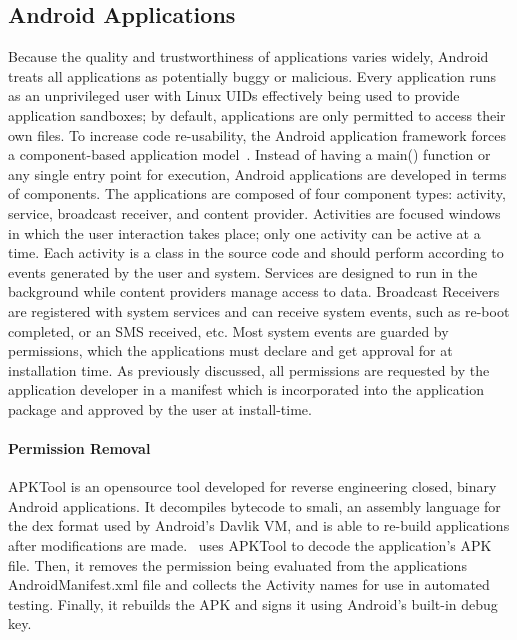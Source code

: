 \subsection{Android Applications}
Because the quality and trustworthiness of applications varies widely, Android treats all applications as potentially buggy or malicious.  Every application runs as an unprivileged user with Linux UIDs effectively being used to provide application sandboxes; by default, applications are only permitted to access their own files.  To increase code re-usability, the Android application framework forces a component-based application model~\cite{4768655}.  Instead of having a main() function or any single entry point for execution, Android applications are developed in terms of components.  The applications are composed of four component types:  activity, service, broadcast receiver, and content provider.  Activities are focused windows in which the user interaction takes place; only one activity can be active at a time.  Each activity is a class in the source code and should perform according to events generated by the user and system.  Services are designed to run in the background while content providers manage access to data.  Broadcast Receivers are registered with system services and can receive system events, such as re-boot completed, or an SMS received, etc.  Most system events are guarded by permissions, which the applications must declare and get approval for at installation time.  As previously discussed, all permissions are requested by the application developer in a manifest which is incorporated into the application package and approved by the user at install-time.  


\paragraph{\bfseries Permission Removal}
APKTool is an opensource tool developed for reverse engineering closed, binary Android applications. It decompiles bytecode to smali, an assembly language for the dex format used by Android's Davlik VM, and is able to re-build applications after modifications are made.  \toolname\ uses APKTool to decode the application's APK file.  Then, it removes the permission being evaluated from the applications AndroidManifest.xml file and collects the Activity names for use in automated testing.  Finally, it rebuilds the APK and signs it using Android's built-in debug key.



